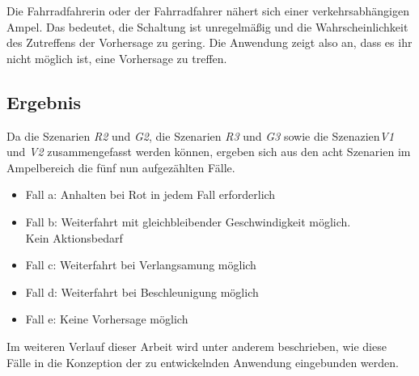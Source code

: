 \centerline{\grayRule}
\begin{description}[leftmargin=0.7cm,style=nextline]
\item[Szenario V2:] 
Die Fahrradfahrerin oder der Fahrradfahrer nähert sich einer verkehrsabhängigen Ampel. Das bedeutet, die Schaltung ist unregelmäßig und die Wahrscheinlichkeit des Zutreffens der Vorhersage zu gering. Die Anwendung zeigt also an, dass es ihr nicht möglich ist, eine Vorhersage zu treffen.\\ 
\end{description} %
\subsection*{Ergebnis}
Da die Szenarien \textit{R2} und \textit{G2}, die Szenarien \textit{R3} und \textit{G3} sowie die Szenazien\textit{V1} und \textit{V2} zusammengefasst werden können, ergeben sich aus den acht Szenarien im Ampelbereich die fünf nun aufgezählten Fälle.
\begin{itemize}
	\item Fall a: Anhalten bei Rot in jedem Fall erforderlich
	\item Fall b: Weiterfahrt mit gleichbleibender Geschwindigkeit möglich.\\ Kein Aktionsbedarf
	\item Fall c: Weiterfahrt bei Verlangsamung möglich
	\item Fall d: Weiterfahrt bei Beschleunigung möglich
	\item Fall e: Keine Vorhersage möglich
\end{itemize}
Im weiteren Verlauf dieser Arbeit wird unter anderem beschrieben, wie diese Fälle in die Konzeption der zu entwickelnden Anwendung eingebunden werden.
